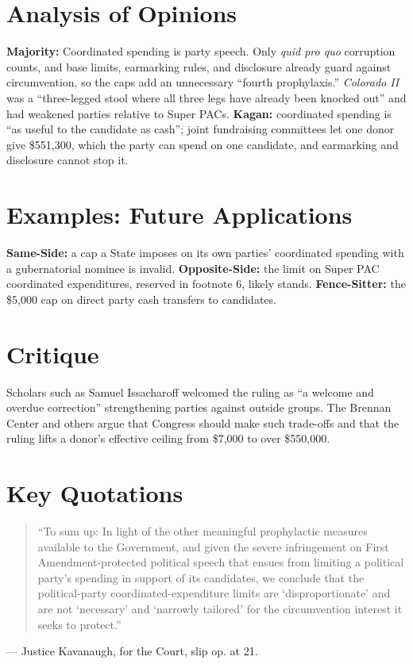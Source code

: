 \documentclass[12pt]{article}
\begin{document}
\section{Analysis of Opinions}
\textbf{Majority:} Coordinated spending is party speech. Only \textit{quid pro quo} corruption counts, and base limits, earmarking rules, and disclosure already guard against circumvention, so the caps add an unnecessary ``fourth prophylaxis.'' \textit{Colorado II} was a ``three-legged stool where all three legs have already been knocked out'' and had weakened parties relative to Super PACs. \textbf{Kagan:} coordinated spending is ``as useful to the candidate as cash''; joint fundraising committees let one donor give \$551,300, which the party can spend on one candidate, and earmarking and disclosure cannot stop it.

\section{Examples: Future Applications}
\textbf{Same-Side:} a cap a State imposes on its own parties' coordinated spending with a gubernatorial nominee is invalid. \textbf{Opposite-Side:} the limit on Super PAC coordinated expenditures, reserved in footnote 6, likely stands. \textbf{Fence-Sitter:} the \$5,000 cap on direct party cash transfers to candidates.

\section{Critique}
Scholars such as Samuel Issacharoff welcomed the ruling as ``a welcome and overdue correction'' strengthening parties against outside groups. The Brennan Center and others argue that Congress should make such trade-offs and that the ruling lifts a donor's effective ceiling from \$7,000 to over \$550,000.

\section{Key Quotations}
\begin{quote}
``To sum up: In light of the other meaningful prophylactic measures available to the Government, and given the severe infringement on First Amendment-protected political speech that ensues from limiting a political party's spending in support of its candidates, we conclude that the political-party coordinated-expenditure limits are `disproportionate' and are not `necessary' and `narrowly tailored' for the circumvention interest it seeks to protect.''
\end{quote}
\noindent --- Justice Kavanaugh, for the Court, slip op. at 21.
\end{document}
